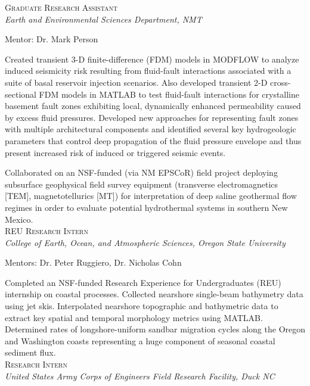 \documentclass[11pt, letterpaper]{article}
\newcommand{\years}[1]{\marginnote{\scriptsize #1}}
\begin{document}
\noindent
\years{2016 - 2017}\textsc{Graduate Research Assistant}\\
\textit{Earth and Environmental Sciences Department, NMT}

    \vspace{3pt} \noindent  
    Mentor: Dr. Mark Person

    Created transient 3-D finite-difference (FDM) models in MODFLOW to analyze
    induced seismicity risk resulting from fluid-fault interactions associated
    with a suite of basal reservoir injection scenarios. Also developed
    transient 2-D cross-sectional FDM models in MATLAB to test fluid-fault
    interactions for crystalline basement fault zones exhibiting local,
    dynamically enhanced permeability caused by excess fluid pressures. 
    Developed new approaches for representing fault zones with multiple
    architectural components and identified several key hydrogeologic
    parameters that control deep propagation of the fluid pressure envelope and
    thus present increased risk of induced or triggered seismic events.

	Collaborated on an NSF-funded (via NM EPSCoR) field project deploying
	subsurface geophysical field survey equipment (transverse electromagnetics [TEM],
	magnetotellurics [MT]) for interpretation of deep saline geothermal flow
	regimes in order to evaluate potential hydrothermal systems in southern New
	Mexico.\\

\noindent
\years{2013}\textsc{REU Research Intern}\\
\textit{College of Earth, Ocean, and Atmospheric Sciences, Oregon State University}

    \vspace{3pt} \noindent  
    Mentors: Dr. Peter Ruggiero, Dr. Nicholas Cohn

    Completed an NSF-funded Research Experience for Undergraduates (REU)
    internship on coastal processes. Collected nearshore single-beam bathymetry
    data using jet skis. Interpolated nearshore topographic and bathymetric
    data to extract key spatial and temporal morphology metrics using MATLAB.
    Determined rates of longshore-uniform sandbar migration cycles along the
    Oregon and Washington coasts representing a huge component of seasonal
    coastal sediment flux.\\

\noindent
\years{2013}\textsc{Research Intern}\\
\textit{United States Army Corps of Engineers Field Research Facility, Duck NC}
\end{document}
